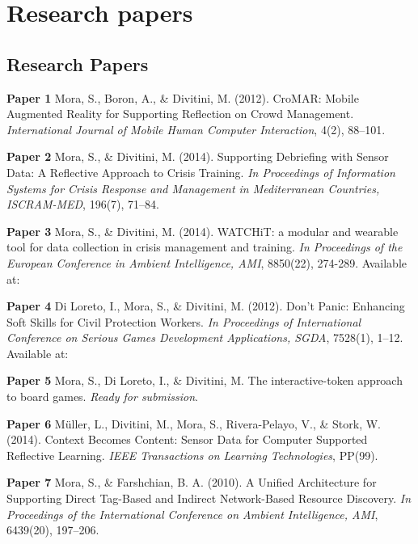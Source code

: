 \part[Part II]{Research papers}

\chapter{Research Papers}\label{papers}

\textbf{Paper 1} Mora, S., Boron, A., \& Divitini, M. (2012). CroMAR:
Mobile Augmented Reality for Supporting Reflection on Crowd Management.
\emph{International Journal of Mobile Human Computer Interaction}, 4(2),
88--101. 

\textbf{Paper 2} Mora, S., \& Divitini, M. (2014). Supporting Debriefing
with Sensor Data: A Reflective Approach to Crisis Training. \emph{In
Proceedings of Information Systems for Crisis Response and Management in
Mediterranean Countries, ISCRAM-MED}, 196(7), 71--84. 

\textbf{Paper 3} Mora, S., \& Divitini, M. (2014). WATCHiT: a modular
and wearable tool for data collection in crisis management and training.
\emph{In Proceedings of the European Conference in Ambient Intelligence,
AMI}, 8850(22), 274-289. Available at:

\textbf{Paper 4} Di Loreto, I., Mora, S., \& Divitini, M. (2012). Don't
Panic: Enhancing Soft Skills for Civil Protection Workers. \emph{In
Proceedings of International Conference on Serious Games Development
Applications, SGDA}, 7528(1), 1--12. Available at:

\textbf{Paper 5} Mora, S., Di Loreto, I., \& Divitini, M. The
interactive-token approach to board games. \emph{Ready for submission}.

\textbf{Paper 6} Müller, L., Divitini, M., Mora, S., Rivera-Pelayo, V.,
\& Stork, W. (2014). Context Becomes Content: Sensor Data for Computer
Supported Reflective Learning. \emph{IEEE Transactions on Learning
Technologies}, PP(99). 

\textbf{Paper 7} Mora, S., \& Farshchian, B. A. (2010). A Unified
Architecture for Supporting Direct Tag-Based and Indirect Network-Based
Resource Discovery. \emph{In Proceedings of the International Conference
on Ambient Intelligence, AMI}, 6439(20), 197--206. 
